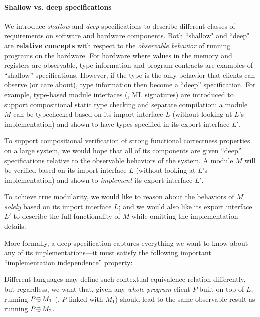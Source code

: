 \paragraph{Shallow vs. deep specifications}
We introduce \emph{shallow} and \emph{deep} specifications to describe different
classes of requirements on software and hardware components.  
Both ``shallow" and ``deep" are \textbf{relative concepts} with respect to
the \emph{observable behavior} of running programs on the hardware.
For hardware where values in the memory and registers
are observable,
type information and program contracts are examples of ``shallow''
specifications. 
However, if the type is the only behavior that clients 
can observe (or care about),
type information then become a ``deep''
specification.
For example, type-based module interfaces (\eg, ML signatures) are
introduced to support compositional static type checking and separate
compilation: a module $M$ can be typechecked based on its import
interface $L$ (without looking at $L$'s implementation) and shown to
have types specified in its export interface $L'$.

To support compositional verification of strong functional correctness
properties on a large system, we would hope that all of its components
are given ``deep'' specifications
relative to the observable behaviors of the system.  A module $M$ will be verified based on
its import interface $L$ (without looking at $L$'s
implementation) and shown to {\em implement} its export interface 
$L'$.

To achieve true modularity, we would like to reason about the
behaviors of $M$ {\em solely} based on its import interface $L$; and
we would also like its export interface $L'$ to describe the full
functionality of $M$ while omitting the implementation details.


More formally, a deep specification captures everything we want to know
about any of its implementations---it must satisfy the following
important ``implementation independence'' property:

\begin{center}
\end{center}%
\noindent{}Different languages may define such contextual equivalence relation
differently, but regardless, we want that, given any {\em
  whole-program} client $P$ built on top of $L$, running
$P\!\oplus\! M_1$ (\ie, $P$ linked with $M_1$) should lead to the same
observable result as running $P\!\oplus\! M_2$.

